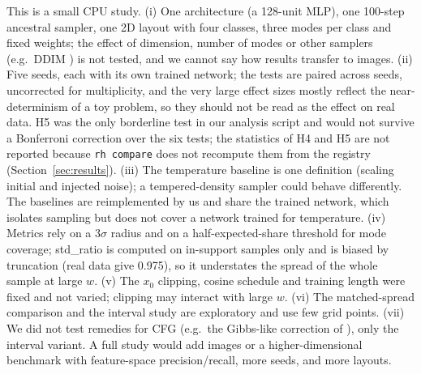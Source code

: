 This is a small CPU study. (i) One architecture (a 128-unit MLP), one 100-step ancestral sampler, one 2D layout with four classes, three modes per class and fixed weights; the effect of dimension, number of modes or other samplers (e.g.\ DDIM \cite{song2020denoising}) is not tested, and we cannot say how results transfer to images. (ii) Five seeds, each with its own trained network; the tests are paired across seeds, uncorrected for multiplicity, and the very large effect sizes mostly reflect the near-determinism of a toy problem, so they should not be read as the effect on real data. H5 was the only borderline test in our analysis script and would not survive a Bonferroni correction over the six tests; the statistics of H4 and H5 are not reported because \texttt{rh compare} does not recompute them from the registry (Section~\ref{sec:results}). (iii) The temperature baseline is one definition (scaling initial and injected noise); a tempered-density sampler could behave differently. The baselines are reimplemented by us and share the trained network, which isolates sampling but does not cover a network trained for temperature. (iv) Metrics rely on a $3\sigma$ radius and on a half-expected-share threshold for mode coverage; std\_ratio is computed on in-support samples only and is biased by truncation (real data give 0.975), so it understates the spread of the whole sample at large $w$. (v) The $x_0$ clipping, cosine schedule and training length were fixed and not varied; clipping may interact with large $w$. (vi) The matched-spread comparison and the interval study are exploratory and use few grid points. (vii) We did not test remedies for CFG (e.g.\ the Gibbs-like correction of \cite{moufad2025conditional}), only the interval variant. A full study would add images or a higher-dimensional benchmark with feature-space precision/recall, more seeds, and more layouts.
